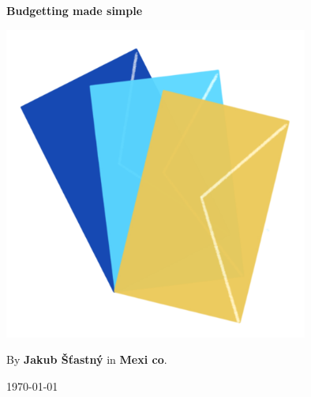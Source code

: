 \pagecolor{CoverPageBackground}

\begin{titlepage}
  \begin{center}

    \textbf{\huge \color{DarkRed} Budgetting made simple}
    \vspace{1.7cm}

    \includegraphics[width=0.75\textwidth]{"assets/envelopes"}
    \vfill

    {\large \color{Indigo} By \textbf{Jakub Šťastný} in \textbf{{\color{DarkRed} Me}{\color{white}xi}{\color{DarkGreen} co}}.}

    \vspace{0.8cm}
    \large\today
  \end{center}
\end{titlepage}

\pagecolor{PageBackground}
